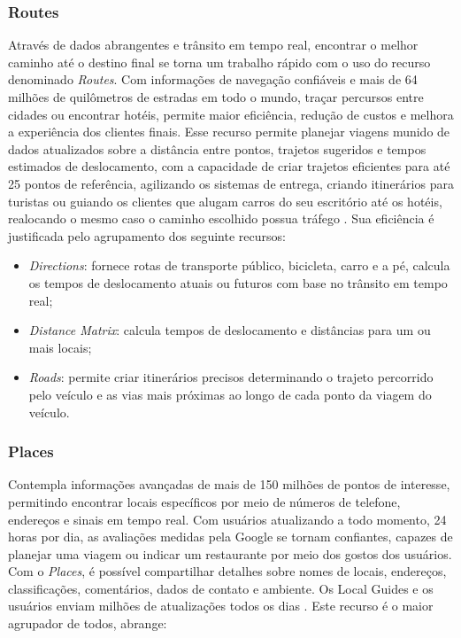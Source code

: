 \subsubsection{Routes}
Através de dados abrangentes e trânsito em tempo real, encontrar o melhor caminho até o destino final se torna um trabalho rápido com o uso do recurso denominado \textit{Routes}. Com informações de navegação confiáveis e mais de 64 milhões de quilômetros de estradas em todo o mundo, traçar percursos entre cidades ou encontrar hotéis, permite maior eficiência, redução de custos e melhora a experiência dos clientes finais. Esse recurso permite planejar viagens munido de dados atualizados sobre a distância entre pontos, trajetos sugeridos e tempos estimados de deslocamento, com a capacidade de criar trajetos eficientes para até 25 pontos de referência, agilizando os sistemas de entrega, criando itinerários para turistas ou guiando os clientes que alugam carros do seu escritório até os hotéis, realocando o mesmo caso o caminho escolhido possua tráfego \cite{google:2019}. Sua eficiência é justificada pelo agrupamento dos seguinte recursos:

\newpage
\begin{itemize}
    \item \textit{Directions}: fornece rotas de transporte público, bicicleta, carro e a pé, calcula os tempos de deslocamento atuais ou futuros com base no trânsito em tempo real;
    \item \textit{Distance Matrix}: calcula tempos de deslocamento e distâncias para um ou mais locais;
    \item \textit{Roads}: permite criar itinerários precisos determinando o trajeto percorrido pelo veículo e as vias mais próximas ao longo de cada ponto da viagem do veículo.
\end{itemize}

\subsubsection{Places}
Contempla informações avançadas de mais de 150 milhões de pontos de interesse, permitindo encontrar locais específicos por meio de números de telefone, endereços e sinais em tempo real. Com usuários atualizando a todo momento, 24 horas por dia, as avaliações medidas pela Google se tornam confiantes, capazes de planejar uma viagem ou indicar um restaurante por meio dos gostos dos usuários. Com o \textit{Places}, é possível compartilhar detalhes sobre nomes de locais, endereços, classificações, comentários, dados de contato e ambiente. Os Local Guides e os usuários enviam milhões de atualizações todos os dias \cite{google:2019}. Este recurso é o maior agrupador de todos, abrange:


